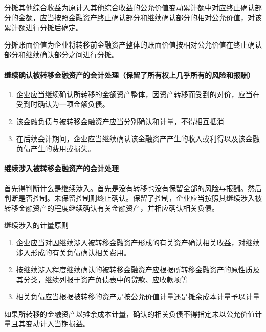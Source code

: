 \documentclass[UTF8,12pt]{ctexart}
\numberwithin{equation}{section} %
\numberwithin{figure}{section}
\numberwithin{table}{section}
\begin{document}
	分摊其他综合收益为原计入其他综合收益的公允价值变动累计额中对应终止确认部分的金额，应当按照金融资产终止确认部分和继续确认部分的相对公允价值，对该累计额进行分摊后确定。
	
	分摊账面价值为企业将转移前金融资产整体的账面价值按相对公允价值在终止确认部分和继续确认部分之间进行分摊。
	
	\paragraph{继续确认被转移金融资产的会计处理（保留了所有权上几乎所有的风险和报酬）}
	\begin{enumerate}
		\item 企业应当继续确认所转移的金额资产整体，因资产转移而受到的对价，应当在受到时确认为一项金额负债。
		
		\item 该金融负债与被转移金融资产应当分别确认和计量，不得相互抵消
		
		\item 在后续会计期间，企业应当继续确认该金融资产产生的收入或利得以及该金融负债产生的费用或损失。
	\end{enumerate}

	\paragraph{继续涉入被转移金融资产的会计处理}
	首先得判断什么是继续涉入。首先是没有转移也没有保留全部的风险与报酬。然后判断是否控制。未保留控制则终止确认。保留了控制，企业应当按照其继续涉入被转移金融资产的程度继续确认有关金融资产，并相应确认相关负债。
	
	继续涉入的计量原则
	\begin{enumerate}
		\item 企业应当对因继续涉入被转移金融资产形成的有关资产确认相关收益，对继续涉入形成的有关负债确认相关费用。
		
		\item 按继续涉入程度继续确认的被转移金融资产应根据所转移金融资产的原性质及其分类，继续列报于资产负债表中的贷款、应收款项等
		
		\item 相关负债应当根据被转移的资产是按公允价值计量还是摊余成本计量予以计量
	\end{enumerate}

	如果所转移的金融资产以摊余成本计量，确认的相关负债不得指定未以公允价值计量且其变动计入当期损益。
	
\end{document}
